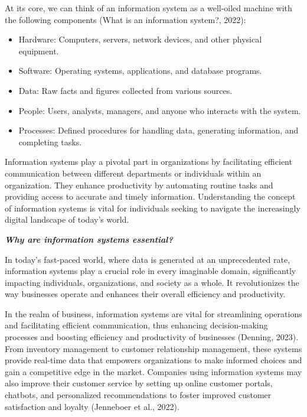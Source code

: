 \documentclass[
  letterpaper,
  DIV=11,
  numbers=noendperiod]{scrreprt}
\providecommand{\tightlist}{%
  \setlength{\itemsep}{0pt}\setlength{\parskip}{0pt}}\usepackage{longtable,booktabs,array}
\begin{document}
At its core, we can think of an information system as a well-oiled
machine with the following components (What is an information system?,
2022):

\begin{itemize}
\tightlist
\item
  Hardware: Computers, servers, network devices, and other physical
  equipment.
\item
  Software: Operating systems, applications, and database programs.
\item
  Data: Raw facts and figures collected from various sources.
\item
  People: Users, analysts, managers, and anyone who interacts with the
  system.
\item
  Processes: Defined procedures for handling data, generating
  information, and completing tasks.
\end{itemize}

Information systems play a pivotal part in organizations by facilitating
efficient communication between different departments or individuals
within an organization. They enhance productivity by automating routine
tasks and providing access to accurate and timely information.
Understanding the concept of information systems is vital for
individuals seeking to navigate the increasingly digital landscape of
today's world.

\textbf{\emph{Why are information systems essential?}}

In today's fast-paced world, where data is generated at an unprecedented
rate, information systems play a crucial role in every imaginable
domain, significantly impacting individuals, organizations, and society
as a whole. It revolutionizes the way businesses operate and enhances
their overall efficiency and productivity.

In the realm of business, information systems are vital for streamlining
operations and facilitating efficient communication, thus enhancing
decision-making processes and boosting efficiency and productivity of
businesses (Denning, 2023). From inventory management to customer
relationship management, these systems provide real-time data that
empowers organizations to make informed choices and gain a competitive
edge in the market. Companies using information systems may also improve
their customer service by setting up online customer portals, chatbots,
and personalized recommendations to foster improved customer
satisfaction and loyalty (Jenneboer et al., 2022).
\end{document}
